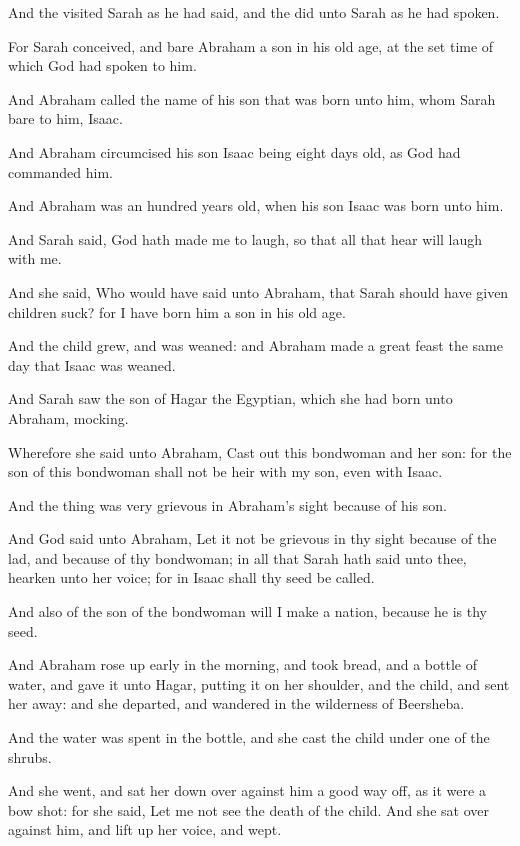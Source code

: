 \verse And the \LORD visited Sarah as he had said, and the \LORD did unto Sarah as he had spoken.

\verse For Sarah conceived, and bare Abraham a son in his old age, at the set time of which God had spoken to him.

\verse And Abraham called the name of his son that was born unto him, whom Sarah bare to him, Isaac.

\verse And Abraham circumcised his son Isaac being eight days old, as God had commanded him.

\verse And Abraham was an hundred years old, when his son Isaac was born unto him.

\verse And Sarah said, God hath made me to laugh, so that all that hear will laugh with me.

\verse And she said, Who would have said unto Abraham, that Sarah should have given children suck? for I have born him a son in his old age.

\verse And the child grew, and was weaned: and Abraham made a great feast the same day that Isaac was weaned.

\verse And Sarah saw the son of Hagar the Egyptian, which she had born unto Abraham, mocking.

\verse Wherefore she said unto Abraham, Cast out this bondwoman and her son: for the son of this bondwoman shall not be heir with my son, even with Isaac.

\verse And the thing was very grievous in Abraham's sight because of his son.

\verse And God said unto Abraham, Let it not be grievous in thy sight because of the lad, and because of thy bondwoman; in all that Sarah hath said unto thee, hearken unto her voice; for in Isaac shall thy seed be called.

\verse And also of the son of the bondwoman will I make a nation, because he is thy seed.

\verse And Abraham rose up early in the morning, and took bread, and a bottle of water, and gave it unto Hagar, putting it on her shoulder, and the child, and sent her away: and she departed, and wandered in the wilderness of Beersheba.

\verse And the water was spent in the bottle, and she cast the child under one of the shrubs.

\verse And she went, and sat her down over against him a good way off, as it were a bow shot: for she said, Let me not see the death of the child. And she sat over against him, and lift up her voice, and wept.

